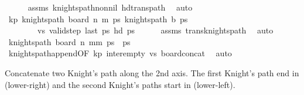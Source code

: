 \begin{isabellebody}
\ \ \ \ \isamarkupfalse%
\ assms\ knights{\isacharunderscore}{\kern0pt}path{\isacharunderscore}{\kern0pt}non{\isacharunderscore}{\kern0pt}nil\ hd{\isacharunderscore}{\kern0pt}trans{\isacharunderscore}{\kern0pt}path\ \isamarkupfalse%
\ auto\isanewline
\ \ \isamarkupfalse%
\ \isamarkupfalse%
\ kp{\isacharcolon}{\kern0pt}\ {\isachardoublequoteopen}knights{\isacharunderscore}{\kern0pt}path\ {\isacharparenleft}{\kern0pt}board\ n\ m\ ps\ {\isachardoublequoteopen}knights{\isacharunderscore}{\kern0pt}path\ {\isacharquery}{\kern0pt}b\ {\isacharquery}{\kern0pt}ps\ \ \isanewline
\ \ \ \ \ \ \ \ vs{\isacharcolon}{\kern0pt}\ {\isachardoublequoteopen}valid{\isacharunderscore}{\kern0pt}step\ {\isacharparenleft}{\kern0pt}last\ ps\ {\isacharparenleft}{\kern0pt}hd\ {\isacharquery}{\kern0pt}ps\isanewline
\ \ \ \ \isamarkupfalse%
\ assms\ trans{\isacharunderscore}{\kern0pt}knights{\isacharunderscore}{\kern0pt}path\ \isamarkupfalse%
\ auto\isanewline
\ \ \isamarkupfalse%
\ \isamarkupfalse%
\ {\isachardoublequoteopen}knights{\isacharunderscore}{\kern0pt}path\ {\isacharparenleft}{\kern0pt}board\ n\ {\isacharparenleft}{\kern0pt}mm\ {\isacharparenleft}{\kern0pt}ps\ {\isacharat}{\kern0pt}\ {\isacharquery}{\kern0pt}ps\isanewline
\ \ \ \ \isamarkupfalse%
\ knights{\isacharunderscore}{\kern0pt}path{\isacharunderscore}{\kern0pt}append{\isacharbrackleft}{\kern0pt}OF\ kp\ inter{\isacharunderscore}{\kern0pt}empty\ vs{\isacharbrackright}{\kern0pt}\ board{\isacharunderscore}{\kern0pt}concat\ \isamarkupfalse%
\ auto\isanewline
{}\isamarkupfalse%
%
\endisatagproof
{\isafoldproof}%
%
\isadelimproof
%
\endisadelimproof
%
\begin{isamarkuptext}%
Concatenate two Knight's path along the 2nd axis. The first Knight's path end in 
 (lower-right) and the second Knight's paths start in  (lower-left).%

\end{isamarkuptext}
\end{isabellebody}
